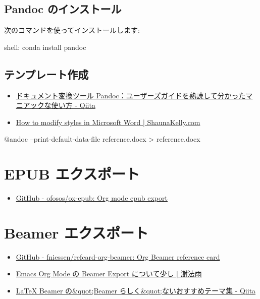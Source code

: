 \documentclass[a4j,12pt,openany,uplatex,dvipdfmx]{jsbook}
\begin{document}
\section{Pandoc のインストール}
\label{sec:orgf678483}
次のコマンドを使ってインストールします:

\begin{programlist}[label={nil}]{shell}{: }conda install pandoc
\end{programlist}



\section{テンプレート作成}
\label{sec:orgc9ec5ed}
\begin{itemize}
\item \href{https://qiita.com/sky\_y/items/5fd5c9568ea550b1d7af}{ドキュメント変換ツール Pandoc：ユーザーズガイドを熟読して分かったマニアックな使い方 - Qiita}
\item \href{https://shaunakelly.com/word/styles/modifyastyle.html}{How to modify styles in Microsoft Word | ShaunaKelly.com}
\end{itemize}


@andoc --print-default-data-file reference.docx > reference.docx
\chapter{EPUB エクスポート}
\label{sec:org4b8c273}
\begin{itemize}
\item \href{https://github.com/ofosos/ox-epub}{GitHub - ofosos/ox-epub: Org mode epub export}
\end{itemize}
\chapter{Beamer エクスポート}
\label{sec:org47f5f36}
\begin{itemize}
\item \href{https://github.com/fniessen/refcard-org-beamer}{GitHub - fniessen/refcard-org-beamer: Org Beamer reference card}
\item \href{https://ryogan.org/blog/2016/01/06/emacs-org-mode-\%25E3\%2581\%25AE-beamer-export-\%25E3\%2581\%25AB\%25E3\%2581\%25A4\%25E3\%2581\%2584\%25E3\%2581\%25A6\%25E5\%25B0\%2591\%25E3\%2581\%2597/}{Emacs Org Mode の Beamer Export について少し | 澍法雨}
\item \href{https://qiita.com/htlsne/items/70cbb488e7a87cd9e228}{\LaTeX{} Beamer の\&quot;Beamer らしく\&quot;ないおすすめテーマ集 - Qiita}
\end{itemize}
\end{document}
